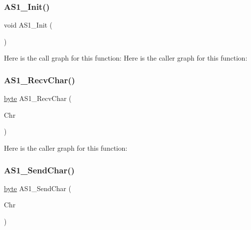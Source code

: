 \subsubsection{\texorpdfstring{A\+S1\+\_\+\+Init()}{AS1\_Init()}}
{\footnotesize\ttfamily void A\+S1\+\_\+\+Init (\begin{DoxyParamCaption}\item[{void}]{ }\end{DoxyParamCaption})}

Here is the call graph for this function\+:
Here is the caller graph for this function\+:
\mbox{\label{group___a_s1__module_ga9b8f8ba49f2260fa77c5dc04d6d0b19c}} 
\subsubsection{\texorpdfstring{A\+S1\+\_\+\+Recv\+Char()}{AS1\_RecvChar()}}
{\footnotesize\ttfamily \hyperlink{group___p_e___types__module_ga0c8186d9b9b7880309c27230bbb5e69d}{byte} A\+S1\+\_\+\+Recv\+Char (\begin{DoxyParamCaption}\item[{\hyperlink{group___a_s1__module_ga621222f7d90195f6b0edb2abeb534e3b}{A\+S1\+\_\+\+T\+Com\+Data} $\ast$}]{Chr }\end{DoxyParamCaption})}

Here is the caller graph for this function\+:
\mbox{\label{group___a_s1__module_gadd3d17688519945b315fcc55a5459f92}} 
\subsubsection{\texorpdfstring{A\+S1\+\_\+\+Send\+Char()}{AS1\_SendChar()}}
{\footnotesize\ttfamily \hyperlink{group___p_e___types__module_ga0c8186d9b9b7880309c27230bbb5e69d}{byte} A\+S1\+\_\+\+Send\+Char (\begin{DoxyParamCaption}\item[{\hyperlink{group___a_s1__module_ga621222f7d90195f6b0edb2abeb534e3b}{A\+S1\+\_\+\+T\+Com\+Data}}]{Chr }\end{DoxyParamCaption})}


